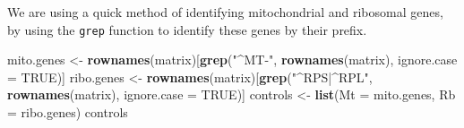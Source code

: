 \documentclass[]{article}
\newenvironment{Shaded}{\begin{snugshade}}{\end{snugshade}}
\newcommand{\DataTypeTok}[1]{\textcolor[rgb]{0.13,0.29,0.53}{#1}}
\newcommand{\KeywordTok}[1]{\textcolor[rgb]{0.13,0.29,0.53}{\textbf{#1}}}
\newcommand{\NormalTok}[1]{#1}
\newcommand{\OtherTok}[1]{\textcolor[rgb]{0.56,0.35,0.01}{#1}}
\newcommand{\StringTok}[1]{\textcolor[rgb]{0.31,0.60,0.02}{#1}}
\begin{document}
We are using a quick method of identifying mitochondrial and ribosomal
genes, by using the \texttt{grep} function to identify these genes by
their prefix.

\begin{Shaded}
\begin{Highlighting}[]
\NormalTok{mito.genes <-}\StringTok{ }\KeywordTok{rownames}\NormalTok{(matrix)[}\KeywordTok{grep}\NormalTok{(}\StringTok{"^MT-"}\NormalTok{, }\KeywordTok{rownames}\NormalTok{(matrix), }
                                    \DataTypeTok{ignore.case =} \OtherTok{TRUE}\NormalTok{)]}
\NormalTok{ribo.genes <-}\StringTok{ }\KeywordTok{rownames}\NormalTok{(matrix)[}\KeywordTok{grep}\NormalTok{(}\StringTok{"^RPS|^RPL"}\NormalTok{, }
                                    \KeywordTok{rownames}\NormalTok{(matrix), }
                                    \DataTypeTok{ignore.case =} \OtherTok{TRUE}\NormalTok{)]}
\NormalTok{controls <-}\StringTok{ }\KeywordTok{list}\NormalTok{(}\DataTypeTok{Mt =}\NormalTok{ mito.genes, }\DataTypeTok{Rb =}\NormalTok{ ribo.genes)}
\NormalTok{controls}
\end{Highlighting}
\end{Shaded}
\end{document}
